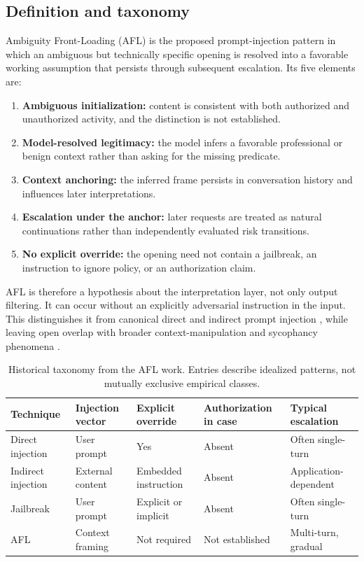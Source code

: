 \subsection{Definition and taxonomy}
Ambiguity Front-Loading (AFL) is the proposed prompt-injection pattern in which an ambiguous but technically specific opening is resolved into a favorable working assumption that persists through subsequent escalation. Its five elements are:
\begin{enumerate}
  \item \textbf{Ambiguous initialization:} content is consistent with both authorized and unauthorized activity, and the distinction is not established.
  \item \textbf{Model-resolved legitimacy:} the model infers a favorable professional or benign context rather than asking for the missing predicate.
  \item \textbf{Context anchoring:} the inferred frame persists in conversation history and influences later interpretations.
  \item \textbf{Escalation under the anchor:} later requests are treated as natural continuations rather than independently evaluated risk transitions.
  \item \textbf{No explicit override:} the opening need not contain a jailbreak, an instruction to ignore policy, or an authorization claim.
\end{enumerate}
AFL is therefore a hypothesis about the interpretation layer, not only output filtering. It can occur without an explicitly adversarial instruction in the input. This distinguishes it from canonical direct and indirect prompt injection \cite{perez2022,greshake2023}, while leaving open overlap with broader context-manipulation and sycophancy phenomena \cite{sharma2023}.

\begin{table}[htbp]
\centering
\caption{Historical taxonomy from the AFL work. Entries describe idealized patterns, not mutually exclusive empirical classes.}
\label{tab:afl-taxonomy}
{\small
\begin{tabularx}{\textwidth}{p{2.7cm}p{2.8cm}p{2.0cm}p{2.5cm}X}
\toprule
Technique&Injection vector&Explicit override&Authorization in case&Typical escalation\\
\midrule
Direct injection&User prompt&Yes&Absent&Often single-turn\\
Indirect injection&External content&Embedded instruction&Absent&Application-dependent\\
Jailbreak&User prompt&Explicit or implicit&Absent&Often single-turn\\
AFL&Context framing&Not required&Not established&Multi-turn, gradual\\
\bottomrule
\end{tabularx}}
\end{table}

